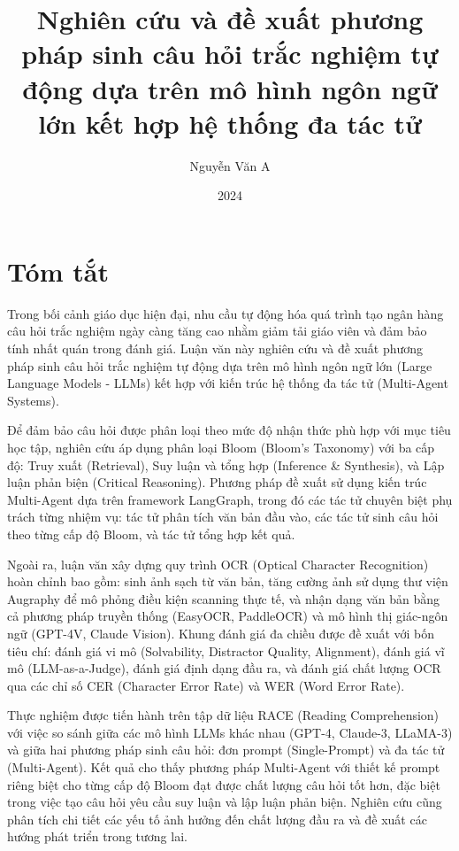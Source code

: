 \documentclass[12pt]{article}
\begin{document}
\title{\textbf{Nghiên cứu và đề xuất phương pháp sinh câu hỏi trắc nghiệm tự động dựa trên mô hình ngôn ngữ lớn kết hợp hệ thống đa tác tử}}
\author{Nguyễn Văn A}
\date{2024}
\maketitle


\section*{Tóm tắt}

Trong bối cảnh giáo dục hiện đại, nhu cầu tự động hóa quá trình tạo ngân hàng câu hỏi trắc nghiệm ngày càng tăng cao nhằm giảm tải giáo viên và đảm bảo tính nhất quán trong đánh giá. Luận văn này nghiên cứu và đề xuất phương pháp sinh câu hỏi trắc nghiệm tự động dựa trên mô hình ngôn ngữ lớn (Large Language Models - LLMs) kết hợp với kiến trúc hệ thống đa tác tử (Multi-Agent Systems).

Để đảm bảo câu hỏi được phân loại theo mức độ nhận thức phù hợp với mục tiêu học tập, nghiên cứu áp dụng phân loại Bloom (Bloom's Taxonomy) với ba cấp độ: Truy xuất (Retrieval), Suy luận và tổng hợp (Inference \& Synthesis), và Lập luận phản biện (Critical Reasoning). Phương pháp đề xuất sử dụng kiến trúc Multi-Agent dựa trên framework LangGraph, trong đó các tác tử chuyên biệt phụ trách từng nhiệm vụ: tác tử phân tích văn bản đầu vào, các tác tử sinh câu hỏi theo từng cấp độ Bloom, và tác tử tổng hợp kết quả.

Ngoài ra, luận văn xây dựng quy trình OCR (Optical Character Recognition) hoàn chỉnh bao gồm: sinh ảnh sạch từ văn bản, tăng cường ảnh sử dụng thư viện Augraphy để mô phỏng điều kiện scanning thực tế, và nhận dạng văn bản bằng cả phương pháp truyền thống (EasyOCR, PaddleOCR) và mô hình thị giác-ngôn ngữ (GPT-4V, Claude Vision). Khung đánh giá đa chiều được đề xuất với bốn tiêu chí: đánh giá vi mô (Solvability, Distractor Quality, Alignment), đánh giá vĩ mô (LLM-as-a-Judge), đánh giá định dạng đầu ra, và đánh giá chất lượng OCR qua các chỉ số CER (Character Error Rate) và WER (Word Error Rate).

Thực nghiệm được tiến hành trên tập dữ liệu RACE (Reading Comprehension) với việc so sánh giữa các mô hình LLMs khác nhau (GPT-4, Claude-3, LLaMA-3) và giữa hai phương pháp sinh câu hỏi: đơn prompt (Single-Prompt) và đa tác tử (Multi-Agent). Kết quả cho thấy phương pháp Multi-Agent với thiết kế prompt riêng biệt cho từng cấp độ Bloom đạt được chất lượng câu hỏi tốt hơn, đặc biệt trong việc tạo câu hỏi yêu cầu suy luận và lập luận phản biện. Nghiên cứu cũng phân tích chi tiết các yếu tố ảnh hưởng đến chất lượng đầu ra và đề xuất các hướng phát triển trong tương lai.
\end{document}
